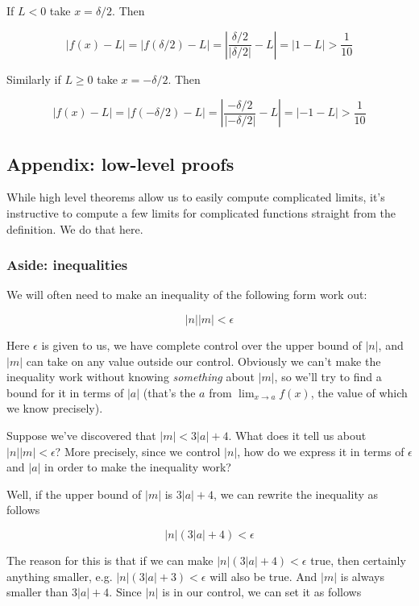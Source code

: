 \vs

If $L<0$ take $x=\delta/2$. Then

\[|f(x)-L|=|f(\delta/2)-L|=\left|\frac{\delta/2}{|\delta/2|}-L\right|=|1-L|>\frac{1}{10}\]

Similarly if $L\geq 0$ take $x=-\delta/2$. Then

\[|f(x)-L|=|f(-\delta/2)-L|=\left|\frac{-\delta/2}{|-\delta/2|}-L\right|=|-1-L|>\frac{1}{10}\]

\subsection{Appendix: low-level proofs}

While high level theorems allow us to easily compute complicated
limits, it's instructive to compute a few limits for complicated
functions straight from the definition. We do that here.

\subsubsection*{Aside: inequalities}

We will often need to make an inequality of the following form work out:

\[|n||m|<\epsilon\]

Here $\epsilon$ is given to us, we have complete control over the upper bound
of $|n|$, and $|m|$ can take on any value outside our control.
Obviously we can't make the inequality work without knowing
\textit{something} about $|m|$, so we'll try to find a bound for it in
terms of $|a|$ (that's the $a$ from $\lim_{x\to a}f(x)$, the value of
which we know precisely).

\vs

Suppose we've discovered that $|m|<3|a|+4$. What does it tell us about
$|n||m|<\epsilon$? More precisely, since we control $|n|$, how do we express
it in terms of $\epsilon$ and $|a|$ in order to make the inequality work?

\vs

Well, if the upper bound of $|m|$ is $3|a|+4$, we can rewrite the
inequality as follows

\[|n|(3|a|+4)<\epsilon\]

The reason for this is that if we can make $|n|(3|a|+4)<\epsilon$ true, then
certainly anything smaller, e.g. $|n|(3|a|+3)<\epsilon$ will also be true.
And $|m|$ is always smaller than $3|a|+4$. Since $|n|$ is in our
control, we can set it as follows

